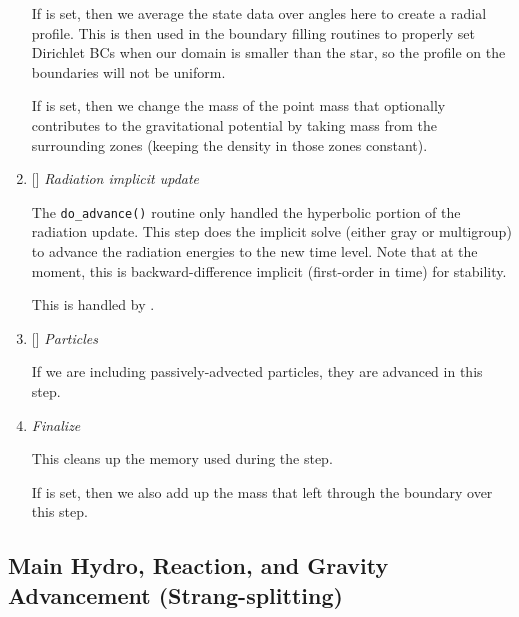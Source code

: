 \begin{enumerate}
  If  is set, then we average the state data
  over angles here to create a radial profile.  This is then used in the 
  boundary filling routines to properly set Dirichlet BCs when our domain
  is smaller than the star, so the profile on the boundaries will not 
  be uniform.

  If  is set, then we
  change the mass of the point mass that optionally contributes to the
  gravitational potential by taking mass from the surrounding zones
  (keeping the density in those zones constant).

\item {[]} {\em Radiation implicit update} 

  The {\tt do\_advance()} routine only handled the hyperbolic
  portion of the radiation update.  This step does the implicit solve
  (either gray or multigroup) to advance the radiation energies to the 
  new time level.  Note that at the moment, this is backward-difference
  implicit (first-order in time) for stability.

  This is handled by .

\item {[]} {\em Particles} 

  If we are including passively-advected particles, they are
  advanced in this step.

\item {\em Finalize}

  This cleans up the memory used during the step.  

  If  is set, then we also add up
  the mass that left through the boundary over this step. 

\end{enumerate}

\subsection{Main Hydro, Reaction, and Gravity Advancement (Strang-splitting)}

